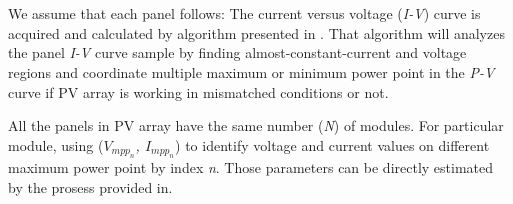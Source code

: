 \documentclass[conference]{IEEEtran}
\begin{document}
\begin{figure}
\centering 
{} \\
 \\
\caption{} 
\end{figure}
















We assume that each panel follows: The current versus voltage (\textit{I-V}) curve is acquired and calculated by algorithm presented in \cite{b6}. That algorithm will analyzes the panel \textit{I-V} curve sample by finding almost-constant-current and voltage regions and coordinate multiple maximum or minimum power point in the \textit{P-V} curve if PV array is working in mismatched conditions or not. 

All the panels in PV array have the same number (\textit{N}) of modules. For particular module, using (\textit{$V_{mpp_n}$, $I_{mpp_n}$}) to identify voltage and current values on different maximum power point by index \textit{n}. Those parameters can be directly estimated by the prosess provided in\cite{b7}.
\end{document}
